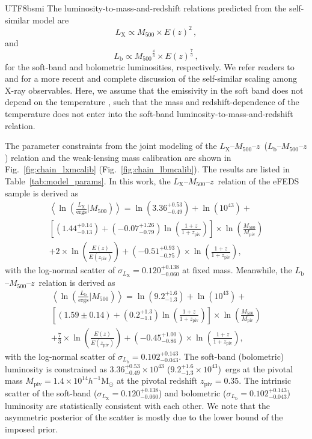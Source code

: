 \documentclass[longauth]{aa}
\newcommand{\Msunh}{\ensuremath{h^{-1}\mathrm{M}_{\odot}}}
\newcommand{\Mfiveoo}{\ensuremath{M_{500}}}
\newcommand{\redshift}{\ensuremath{z}}
\newcommand{\MPIV}{\ensuremath{M_{\mathrm{piv}}}}
\newcommand{\ZPIV}{\ensuremath{z_{\mathrm{piv}}}}
\newcommand{\Ez}{\ensuremath{E(z)}}
\newcommand{\Ezpiv}{\ensuremath{E(z_{\mathrm{piv}})}}
\newcommand{\Lx}{\ensuremath{L_{\mathrm{X}}}}
\newcommand{\Lb}{\ensuremath{L_{\mathrm{b}}}}
\newcommand{\sigmalx}{\ensuremath{\sigma_{L_{\mathrm{X}}}}}
\newcommand{\sigmalb}{\ensuremath{\sigma_{L_{\mathrm{b}}}}}
\newcommand{\ansAlx}{\ensuremath{ 3.36^{+0.53}_{-0.49} }}
\newcommand{\ansBlx}{\ensuremath{ 1.44^{+0.14}_{-0.13} }}
\newcommand{\ansdeltalx}{\ensuremath{ -0.07^{+1.26}_{-0.79} }}
\newcommand{\ansgammalx}{\ensuremath{ -0.51^{+0.93}_{-0.75} }}
\newcommand{\anssigmalx}{\ensuremath{ 0.120^{+0.138}_{-0.060} }}
\newcommand{\ansAlb}{\ensuremath{ 9.2^{+1.6}_{-1.3} }}
\newcommand{\ansBlb}{\ensuremath{ 1.59\pm 0.14 }}
\newcommand{\ansdeltalb}{\ensuremath{ 0.2^{+1.3}_{-1.1} }}
\newcommand{\ansgammalb}{\ensuremath{ -0.45^{+1.00}_{-0.86} }}
\newcommand{\anssigmalb}{\ensuremath{ 0.102^{+0.143}_{-0.043} }}
\begin{document}
\begin{CJK*}{UTF8}{bsmi}
The luminosity-to-mass-and-redshift relations predicted from the self-similar model \citep{kaiser1986} are
\[
\Lx \propto \Mfiveoo \times E(\redshift)^{2} \, ,
\]
and
\[
\Lb \propto {\Mfiveoo}^{\frac{4}{3}} \times E(\redshift)^{\frac{7}{3}} \, ,
\]
for the soft-band and bolometric luminosities, respectively.
We refer readers to \cite{boehringer12} and \cite{giodini13} for a more recent and complete discussion of the self-similar scaling among X-ray observables.
Here, we assume that the emissivity in the soft band does not depend on the temperature 
\citep[see Fig.~1 in][]{mohr99}, such that the mass and redshift-dependence of the temperature does not enter into the soft-band luminosity-to-mass-and-redshift relation.




The parameter constraints from the joint modeling of  the \Lx--\Mfiveoo--\redshift\ (\Lb--\Mfiveoo--\redshift) relation and the weak-lensing mass calibration are shown in Fig.~\ref{fig:chain_lxmcalib} (Fig.~\ref{fig:chain_lbmcalib}).
The results are listed in Table~\ref{tab:model_params}.
In this work, the \Lx--\Mfiveoo--\redshift\ relation of the eFEDS sample is derived as
%
\begin{multline}
\label{eq:lm}
\left\langle\ln\left(\frac{ \Lx  }{ \mathrm{ergs} } \Bigg| \Mfiveoo \right) \right\rangle 
= \ln \left( \ansAlx \right) + \ln \left( 10^{43} \right) + \\
\left[ \left( \ansBlx \right) + \left( \ansdeltalx \right) \ln\left(\frac{1 + \redshift}{1 + \ZPIV}\right) \right] \times
\ln\left(\frac{\Mfiveoo}{\MPIV}\right) \\
 + 2 \times \ln\left(\frac{\Ez}{\Ezpiv}\right) + 
\left( \ansgammalx \right)
 \times \ln \left(\frac{1 + \redshift}{1 + \ZPIV}\right),
\end{multline}
%
with the log-normal scatter of $\sigmalx = \anssigmalx$ at fixed mass.
Meanwhile, the \Lb--\Mfiveoo--\redshift\ relation is derived as
%
\begin{multline}
\label{eq:lbm}
\left\langle\ln\left( \frac{ \Lb }{\mathrm{ergs} } \Bigg| \Mfiveoo \right) \right\rangle 
= \ln \left( \ansAlb \right) + \ln \left( 10^{43} \right) + \\
\left[ \left( \ansBlb \right) + \left( \ansdeltalb \right) \ln\left(\frac{1 + \redshift}{1 + \ZPIV}\right) \right] \times
\ln\left(\frac{\Mfiveoo}{\MPIV}\right) \\
 +\frac{7}{3} \times \ln\left(\frac{\Ez}{\Ezpiv}\right) + 
\left( \ansgammalb \right)
 \times \ln \left(\frac{1 + \redshift}{1 + \ZPIV}\right),
\end{multline}
%
with the log-normal scatter of $\sigmalb = \anssigmalb$.
The soft-band (bolometric) luminosity is constrained as $\ansAlx \times 10^{43}$ ($\ansAlb \times 10^{43}$)~ergs at the pivotal mass $\MPIV=1.4\times10^{14}\Msunh$ at the pivotal redshift $\ZPIV = 0.35$.
The intrinsic scatter of the soft-band ($\sigmalx = \anssigmalx$) and bolometric ($\sigmalb = \anssigmalb$) luminosity are statistically consistent with each other.
We note that the asymmetric posterior of the scatter is mostly due to the lower bound of the imposed prior. 



\end{CJK*}
\end{document}
